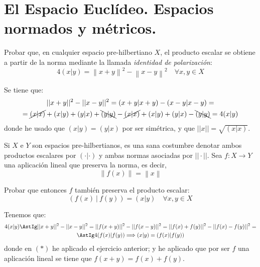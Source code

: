 \section{El Espacio Euclídeo. Espacios normados y métricos.}

\begin{ejercicio}
    Probar que, en cualquier espacio pre-hilbertiano $X$, el producto escalar se obtiene a partir de la norma mediante la llamada \emph{identidad de polarización}:
    \begin{equation*}
        4(x|y)=\left\lVert x+y \right\rVert^{2} - \left\lVert x-y \right\rVert^{2} \quad \forall x,y \in X 
    \end{equation*}

    Se tiene que:
    \begin{multline*}
        ||x+y||^2 - ||x-y||^2 = (x+y|x+y) - (x-y|x-y) =\\=
        \cancel{(x|x)} + (x|y) + (y|x) + \bcancel{(y|y)} - \cancel{(x|x)} + (x|y) + (y|x) - \bcancel{(y|y)} = 4(x|y)
    \end{multline*}
    donde he usado que $(x|y)=(y|x)$ por ser simétrica, y que $||x||=\sqrt{(x|x)}$.
\end{ejercicio}

\begin{ejercicio}
     Si $X$ e $Y$ son espacios pre-hilbertianos, es una sana costumbre denotar ambos productos escalares por $(\cdot|\cdot)$ y ambas normas asociadas por $||\cdot ||$. Sea $f : X \to Y$ una aplicación lineal que preserva la norma, es decir,
     \begin{equation*}
        \left\lVert f(x) \right\rVert = \left\lVert x \right\rVert
    \end{equation*}

    Probar que entonces $f$ también preserva el producto escalar:
    \begin{equation*}
        \left( f(x) \ | \ f(y) \right) = (x|y) \quad \forall  x,y \in X
    \end{equation*}

    Tenemos que:
    \begin{multline*}
        4(x|y)
        \AstIg ||x+y||^2 - ||x-y||^2
        = ||f(x+y)||^2 - ||f(x-y)||^2
        = ||f(x)+f(y)||^2 - ||f(x)-f(y)||^2
        =\\\AstIg 4(f(x)|f(y)) \Longrightarrow (x|y)=(f(x)|f(y))
    \end{multline*}
    donde en $(\ast)$ he aplicado el ejercicio anterior; y he aplicado que por ser $f$ una aplicación lineal se tiene que $f(x+y)=f(x)+f(y)$.
\end{ejercicio}


